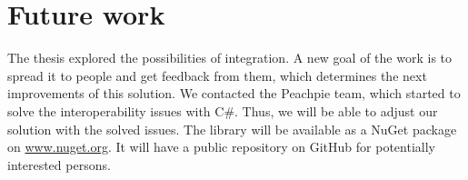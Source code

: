 \section{Future work}

The thesis explored the possibilities of integration.
A new goal of the work is to spread it to people and get feedback from them, which determines the next improvements of this solution.
We contacted the Peachpie team, which started to solve the interoperability issues with C\#.
Thus, we will be able to adjust our solution with the solved issues.
The library will be available as a NuGet package on \url{www.nuget.org}. It will have a public repository on GitHub for potentially interested persons.

